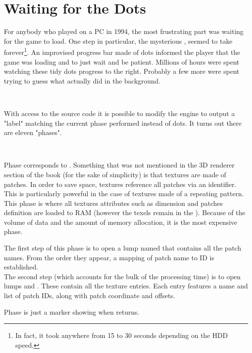 \section{Waiting for the Dots}
\label{dots_explained}
For anybody who played \doom{} on a PC in 1994, the most frustrating part was waiting for the game to load. One step in particular, the mysterious , seemed to take forever\footnote{In fact, it took anywhere from 15 to 30 seconds depending on the HDD speed.}. An improvised progress bar made of dots informed the player that the game was loading and to just wait and be patient. Millions of hours were spent watching these tidy dots progress to the right. Probably a few more were spent trying to guess what  actually did in the background.\\
\par
{}\\
\par
With access to the source code it is possible to modify the engine to output a "label" matching the current phase performed instead of dots. It turns out there are eleven "phases".\\
\par
{}\\
\par

Phase  corresponds to . Something that was not mentioned in the 3D renderer section of the book (for the sake of simplicity) is that textures are made of patches. In order to save space, textures reference all patches via an identifier. This is particularly powerful in the case of textures made of a repeating pattern. This phase is where all textures attributes such as dimension and patches definition are loaded to RAM (however the texels remain in the ). Because of the volume of data and the amount of  memory allocation, it is the most expensive phase.\\
\par
The first step of this phase is to open a lump named  that contains all the patch names. From the order they appear, a mapping of patch name to ID is established.\\
The second step (which accounts for the bulk of the processing time) is to open lumps  and . These contain all the texture entries. Each entry features a name and list of patch IDs, along with patch coordinate and offsets.\\
\par
Phase  is just a marker showing when  returns.\\
\par

